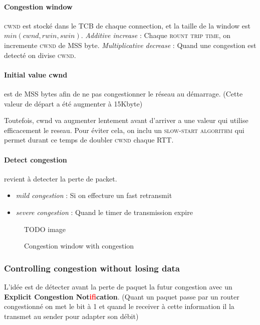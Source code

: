\paragraph{Congestion window}
\textsc{cwnd} est stocké dans le \textsc{TCB} de chaque connection, et la taille de la window
est $min(cwnd, rwin, swin)$.  \textit{Additive increase} : Chaque \textsc{rount trip time}, on incremente \textsc{cwnd} de MSS byte. \textit{Multiplicative decrease} : Quand une congestion
est detecté on divise \textsc{cwnd}.

\paragraph{Initial value cwnd}
est de MSS bytes afin de ne pas congestionner le réseau au démarrage.
(Cette valeur de départ a été augmenter à 15Kbyte)


Toutefois, cwnd va augmenter lentement avant d'arriver a une valeur qui utilise efficacement le
reseau. Pour éviter cela, on inclu un \textsc{slow-start algorithm} qui permet durant ce temps
de doubler \textsc{cwnd} chaque RTT.

\paragraph{Detect congestion} revient à detecter la perte de packet.
\begin{itemize}
    \item \textit{mild congestion} : Si on effecture un fast retransmit
    \item \textit{severe congestion} : Quand le timer de transmission expire
\end{itemize}

\begin{figure}
    TODO image
   \caption{Congestion window with congestion}
\end{figure}

\subsubsection{Controlling congestion without losing data}
L'idée est de détecter avant la perte de paquet la futur congestion avec un
\textbf{Explicit Congestion Not\textcolor{red}{if}ication}. (Quant un paquet passe par un router
congestionné on met le bit à 1 et quand le receiver à cette information il la
transmet au sender pour adapter son débit)


